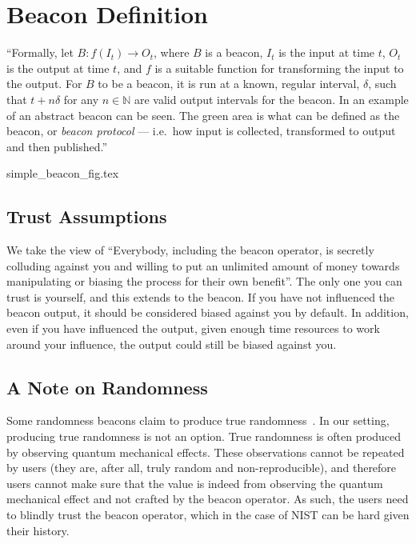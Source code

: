 \section{Beacon Definition}


\enquote{Formally, let $B: f(I_t) \rightarrow O_t$, where $B$ is a beacon, $I_t$ is the input at time $t$, $O_t$ is the output at time $t$, and $f$ is a suitable function for transforming the input to the output.
For $B$ to be a beacon, it is run at a known, regular interval, $\delta$, such that $t+n\delta$ for any $n \in \mathbb{N}$ are valid output intervals for the beacon.
In  an example of an abstract beacon can be seen.
The green area is what can be defined as the beacon, or \emph{beacon protocol} --- i.e.\ how input is collected, transformed to output and then published.}

{simple_beacon_fig.tex}


\subsection{Trust Assumptions}

We take the view of \enquote{Everybody, including the beacon operator, is secretly colluding against you and willing to put an unlimited amount of money towards manipulating or biasing the process for their own benefit}.
The only one you can trust is yourself, and this extends to the beacon. If you have not influenced the beacon output, it should be considered biased against you by default. In addition, even if you have influenced the output, given enough time resources to work around your influence, the output could still be biased against you. 

\subsection{A Note on Randomness}
Some randomness beacons claim to produce true randomness~\cite{nistbeacon}.
In our setting, producing true randomness is not an option.
True randomness is often produced by observing quantum mechanical effects.
These observations cannot be repeated by users (they are, after all, truly random and non-reproducible), and therefore users cannot make sure that the value is indeed from observing the quantum mechanical effect and not crafted by the beacon operator.
As such, the users need to blindly trust the beacon operator, which in the case of NIST can be hard given their history\cite{nytimes-nsabackdoors, nytimes-nsaconstants, nist2014backdoor}.

